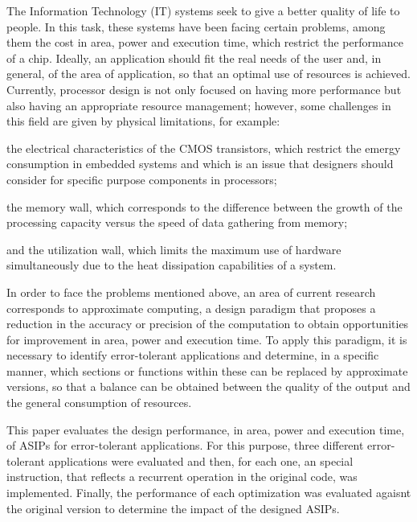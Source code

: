 \documentclass[conference]{IEEEtran}
\begin{document}
The Information Technology (IT) systems seek to give a better quality of
life to people. In this task, these systems have been facing
certain problems, among them the cost in area, power and execution time, which
restrict the performance of a chip. Ideally, an application should fit the
real needs of the user and, in general, of the area of application, so that an optimal
use of resources is achieved. Currently, processor design is not only focused on
having more performance but also having an appropriate resource management;
however, some challenges in this field are given by physical limitations,
for example:

\begin{compactitem}
 \item the electrical characteristics of the CMOS transistors, which
 restrict the emergy consumption in embedded systems and which is an issue
 that designers should consider for specific purpose
 components in processors;
 

 \item the memory wall, which corresponds to the difference between the growth
 of the processing capacity versus the speed of data gathering
 from memory;

 \item and the utilization wall, which limits the maximum use of hardware
 simultaneously due to the heat dissipation capabilities of a system.
\end{compactitem}

In order to face the problems mentioned above, an area of
current research corresponds to approximate computing, a
design paradigm that proposes a reduction in the accuracy or precision of the
computation to obtain opportunities for improvement in
area, power and execution time. To apply this paradigm, it is necessary to
identify error-tolerant applications and determine, in a specific manner,
which sections or functions within these can be replaced by
approximate versions, so that a balance can be obtained between the quality
of the output and the general consumption of resources.

This paper evaluates the design performance, in area, power and execution time, of ASIPs
for error-tolerant applications. For this purpose, three different error-tolerant applications
were evaluated and then, for each one, an special instruction, that reflects a recurrent operation 
in the original code, was implemented. Finally, the performance of each optimization
was evaluated agaisnt the original version to determine the impact of the designed ASIPs.
\end{document}
